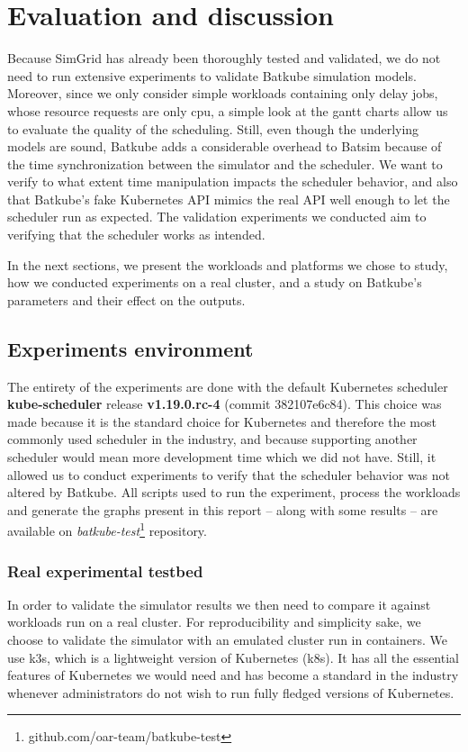 \chapter{Evaluation and discussion}

Because SimGrid has already been thoroughly tested and validated, we do not
need to run extensive experiments to validate Batkube simulation models.
Moreover, since we only consider simple workloads containing only delay jobs,
whose resource requests are only cpu, a simple look at the gantt charts allow
us to evaluate the quality of the scheduling. Still, even though the underlying
models are sound, Batkube adds a considerable overhead to Batsim because of the
time synchronization between the simulator and the scheduler. We want to verify
to what extent time manipulation impacts the scheduler behavior, and also that
Batkube's fake Kubernetes API mimics the real API well enough to let the
scheduler run as expected. The validation experiments we conducted aim to
verifying that the scheduler works as intended.

In the next sections, we present the workloads and platforms we chose to study,
how we conducted experiments on a real cluster, and a study on Batkube's
parameters and their effect on the outputs.

\section{Experiments environment}

The entirety of the experiments are done with the default Kubernetes scheduler
\textbf{kube-scheduler} release \textbf{v1.19.0.rc-4} (commit 382107e6c84).
This choice was made because it is the standard choice for Kubernetes and
therefore the most commonly used scheduler in the industry, and because
supporting another scheduler would mean more development time which we did not
have. Still, it allowed us to conduct experiments to verify that the scheduler
behavior was not altered by Batkube.  All scripts used to run the experiment,
process the workloads and generate the graphs present in this report -- along
with some results -- are available on
\textit{batkube-test}\footnote{github.com/oar-team/batkube-test} repository.

\subsection{Real experimental testbed}

In order to validate the simulator results we then need to compare it against
workloads run on a real cluster. For reproducibility and simplicity sake, we
choose to validate the simulator with an emulated cluster run in containers. We
use k3s, which is a lightweight version of Kubernetes (k8s). It has all the
essential features of Kubernetes we would need and has become a standard in the
industry whenever administrators do not wish to run fully fledged versions of
Kubernetes.\\

